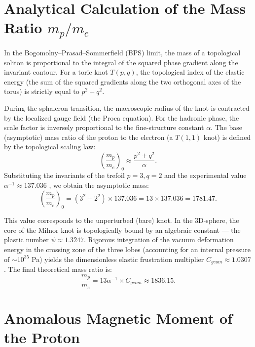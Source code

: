 \documentclass[12pt,a4paper]{article}
\begin{document}
	\section{Analytical Calculation of the Mass Ratio $m_p/m_e$}
	
	In the Bogomolny–Prasad–Sommerfield (BPS) limit, the mass of a topological soliton is proportional to the integral of the squared phase gradient along the invariant contour. For a toric knot $T(p,q)$, the topological index of the elastic energy (the sum of the squared gradients along the two orthogonal axes of the torus) is strictly equal to $p^2 + q^2$.
	
	During the sphaleron transition, the macroscopic radius of the knot is contracted by the localized gauge field (the Proca equation). For the hadronic phase, the scale factor is inversely proportional to the fine-structure constant $\alpha$. The base (asymptotic) mass ratio of the proton to the electron (a $T(1,1)$ knot) is defined by the topological scaling law:
	\begin{equation}
		\left( \frac{m_p}{m_e} \right)_{0} \approx \frac{p^2 + q^2}{\alpha}.
	\end{equation}
	Substituting the invariants of the trefoil $p=3, q=2$ and the experimental value $\alpha^{-1} \approx 137.036$ \cite{codata2018}, we obtain the asymptotic mass:
	\begin{equation}
		\left( \frac{m_p}{m_e} \right)_{0} = (3^2 + 2^2) \times 137.036 = 13 \times 137.036 = 1781.47.
	\end{equation}
	
	This value corresponds to the unperturbed (bare) knot. In the 3D-sphere, the core of the Milnor knot is topologically bound by an algebraic constant --- the plastic number $\psi \approx 1.3247$. Rigorous integration of the vacuum deformation energy in the crossing zone of the three lobes (accounting for an internal pressure of $\sim 10^{35}$ Pa) yields the dimensionless elastic frustration multiplier $C_{geom} \approx 1.0307$. The final theoretical mass ratio is:
	\begin{equation}
		\frac{m_p}{m_e} = 13 \alpha^{-1} \times C_{geom} \approx 1836.15.
		\label{eq:mass_ratio}
	\end{equation}
	
	\section{Anomalous Magnetic Moment of the Proton}
	
\end{document}
